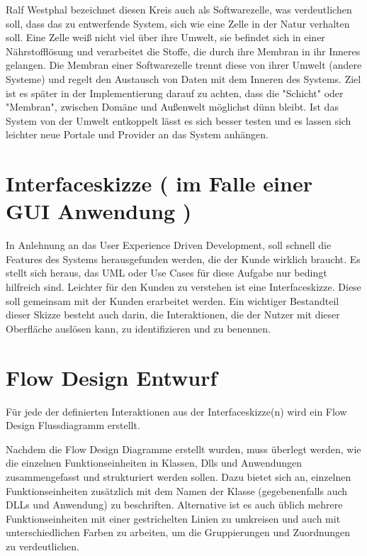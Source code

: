 Ralf Westphal bezeichnet diesen Kreis auch als Softwarezelle, was
verdeutlichen soll, dass das zu entwerfende System, sich wie eine Zelle in der
Natur verhalten soll. Eine Zelle weiß nicht viel über ihre Umwelt, sie befindet sich in
einer Nährstofflösung und verarbeitet die Stoffe, die durch ihre Membran in
ihr Inneres gelangen. Die Membran einer Softwarezelle trennt diese von
ihrer Umwelt (andere Systeme) und regelt den Austausch von Daten mit dem
Inneren des Systems. Ziel ist es später in der Implementierung darauf zu
achten, dass die "Schicht" oder "Membran", zwischen Domäne und Außenwelt möglichst
dünn bleibt.
Ist das System von der Umwelt entkoppelt lässt es sich besser testen und es
lassen sich leichter neue Portale und Provider an das System anhängen.

\section{Interfaceskizze ( im Falle einer GUI Anwendung )}

In Anlehnung an das User Experience Driven Development, soll schnell die
Features des Systems herausgefunden werden, die der Kunde wirklich
braucht. Es stellt sich heraus, das UML oder Use Cases für diese Aufgabe nur
bedingt hilfreich sind. Leichter für den Kunden zu verstehen ist eine
Interfaceskizze.
Diese soll gemeinsam mit der Kunden erarbeitet werden. Ein wichtiger Bestandteil
dieser Skizze besteht auch darin, die Interaktionen, die der
Nutzer mit dieser Oberfläche auslösen kann, zu identifizieren und zu benennen.

\section{Flow Design Entwurf}

Für jede der definierten Interaktionen aus der Interfaceskizze(n) wird ein Flow Design Flussdiagramm
erstellt.

Nachdem die Flow Design Diagramme erstellt wurden, muss überlegt werden, wie die
einzelnen Funktionseinheiten in Klassen, Dlls und Anwendungen zusammengefasst
und strukturiert werden sollen.
Dazu bietet sich an, einzelnen Funktionseinheiten zusätzlich mit dem Namen der
Klasse (gegebenenfalls auch DLLs und Anwendung) zu beschriften. Alternative ist es
auch üblich mehrere Funktionseinheiten mit einer gestrichelten Linien zu
umkreisen und auch mit unterschiedlichen Farben zu arbeiten, um die Gruppierungen und Zuordnungen zu verdeutlichen. 

